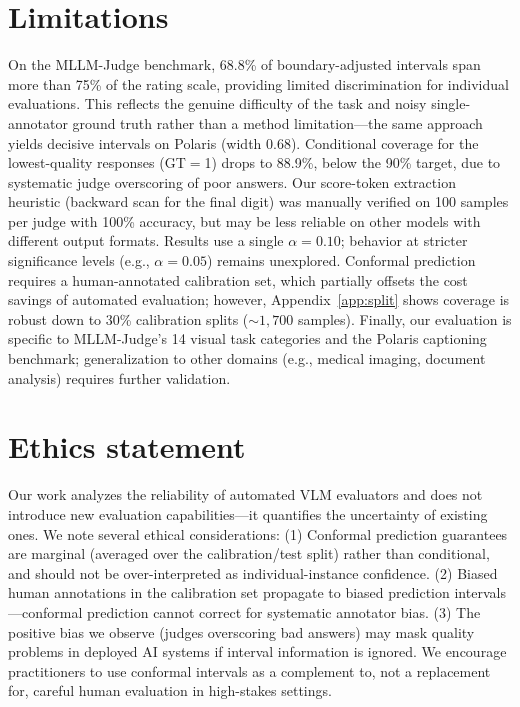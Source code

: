 \documentclass{article}
\begin{document}
\section*{Limitations}
On the MLLM-Judge benchmark, 68.8\% of boundary-adjusted intervals span more than 75\% of the rating scale, providing limited discrimination for individual evaluations. This reflects the genuine difficulty of the task and noisy single-annotator ground truth rather than a method limitation---the same approach yields decisive intervals on Polaris (width 0.68). Conditional coverage for the lowest-quality responses (GT$=$1) drops to 88.9\%, below the 90\% target, due to systematic judge overscoring of poor answers. Our score-token extraction heuristic (backward scan for the final digit) was manually verified on 100 samples per judge with 100\% accuracy, but may be less reliable on other models with different output formats. Results use a single $\alpha = 0.10$; behavior at stricter significance levels (e.g., $\alpha = 0.05$) remains unexplored. Conformal prediction requires a human-annotated calibration set, which partially offsets the cost savings of automated evaluation; however, Appendix~\ref{app:split} shows coverage is robust down to 30\% calibration splits (${\sim}1{,}700$ samples). Finally, our evaluation is specific to MLLM-Judge's 14 visual task categories and the Polaris captioning benchmark; generalization to other domains (e.g., medical imaging, document analysis) requires further validation.

\section*{Ethics statement}
Our work analyzes the reliability of automated VLM evaluators and does not introduce new evaluation capabilities---it quantifies the uncertainty of existing ones. We note several ethical considerations: (1) Conformal prediction guarantees are marginal (averaged over the calibration/test split) rather than conditional, and should not be over-interpreted as individual-instance confidence. (2) Biased human annotations in the calibration set propagate to biased prediction intervals---conformal prediction cannot correct for systematic annotator bias. (3) The positive bias we observe (judges overscoring bad answers) may mask quality problems in deployed AI systems if interval information is ignored. We encourage practitioners to use conformal intervals as a complement to, not a replacement for, careful human evaluation in high-stakes settings.
\end{document}
